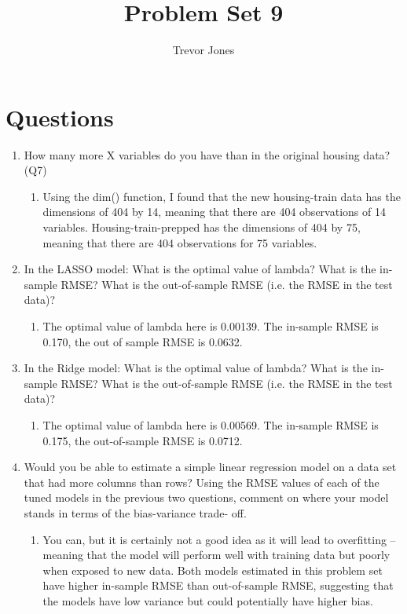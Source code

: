 \documentclass{article}
\title{Problem Set 9}
\author{Trevor Jones}
\begin{document}
\maketitle

\section{Questions}
\begin{enumerate}
    \item How many more X variables do you have than in the original housing data? (Q7)
    \begin{enumerate}
        \item Using the dim() function, I found that the new housing-train data has the dimensions of 404 by 14, meaning that there are 404 observations of 14 variables. Housing-train-prepped has the dimensions of 404 by 75, meaning that there are 404 observations for 75 variables. 
    \end{enumerate}
    \item In the LASSO model: What is the optimal value of lambda? What is the in-sample RMSE? What is the out-of-sample RMSE (i.e. the RMSE in the test data)?
    \begin{enumerate}
        \item The optimal value of lambda here is 0.00139. The in-sample RMSE is 0.170, the out of sample RMSE is 0.0632. 
    \end{enumerate}
    \item In the Ridge model: What is the optimal value of lambda? What is the in-sample RMSE? What is the out-of-sample RMSE (i.e. the RMSE in the test data)?
    \begin{enumerate}
        \item The optimal value of lambda here is 0.00569. The in-sample RMSE is 0.175, the out-of-sample RMSE is 0.0712. 
    \end{enumerate}
    \item Would you be able to estimate a simple linear regression model on a data set that had more columns than rows? Using the RMSE values of each of the tuned models in the previous two questions, comment on where your model stands in terms of the bias-variance trade- off.
    \begin{enumerate}
        \item You can, but it is certainly not a good idea as it will lead to overfitting -- meaning that the model will perform well with training data but poorly when exposed to new data. Both models estimated in this problem set have higher in-sample RMSE than out-of-sample RMSE, suggesting that the models have low variance but could potentially have higher bias. 
    \end{enumerate}
\end{enumerate}
\pagebreak
\end{document}
